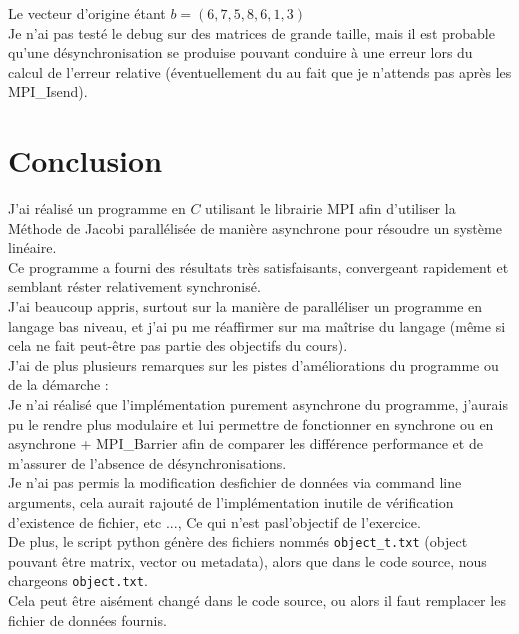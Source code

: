 \documentclass[11pt, a4paper]{article}
\begin{document}
Le vecteur d'origine étant $b = (6,7,5,8,6,1,3)$\\

Je n'ai pas testé le debug sur des matrices de grande taille, mais il est probable qu'une désynchronisation se produise pouvant conduire à une erreur lors du calcul de l'erreur relative (éventuellement du au fait que je n'attends pas après les MPI\_Isend).

\newpage

\section{Conclusion}

J'ai réalisé un programme en $C$ utilisant le librairie MPI afin d'utiliser la Méthode de Jacobi parallélisée de manière asynchrone pour résoudre un système linéaire.\\

Ce programme a fourni des résultats très satisfaisants, convergeant rapidement et semblant réster relativement synchronisé.\\

J'ai beaucoup appris, surtout sur la manière de paralléliser un programme en langage bas niveau, et j'ai pu me réaffirmer sur ma ma\^itrise du langage (m\^eme si cela ne fait peut-\^etre pas partie des objectifs du cours).\\

J'ai de plus plusieurs remarques sur les pistes d'améliorations du programme ou de la démarche :\\

Je n'ai réalisé que l'implémentation purement asynchrone du programme, j'aurais pu le rendre plus modulaire et lui permettre de fonctionner en synchrone ou en asynchrone + MPI\_Barrier afin de comparer les différence performance et de m'assurer de l'absence de désynchronisations.\\

Je n'ai pas permis la modification desfichier de données via command line arguments, cela aurait rajouté de l'implémentation inutile de vérification d'existence de fichier, etc ..., Ce qui n'est pasl'objectif de l'exercice.\\
De plus, le script python génère des fichiers nommés \texttt{object\_t.txt} (object pouvant \^etre matrix, vector ou metadata), alors que dans le code source, nous chargeons \texttt{object.txt}.\\
Cela peut \^etre aisément changé dans le code source, ou alors il faut remplacer les fichier de données fournis.
\end{document}
